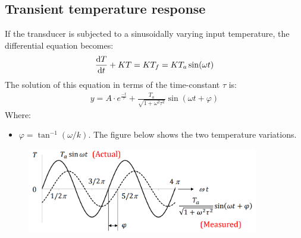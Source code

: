 \documentclass[class=report, crop=false, 12pt,a4paper]{standalone}
\begin{document}
\subsection{Transient temperature response}
If the transducer is subjected to a sinusoidally varying input temperature, the differential equation becomes:
\begin{gather}
  \frac{\dif T}{\dif t}+KT = KT_f = KT_a\sin(\omega t)
\end{gather}
The solution of this equation in terms of the time-constant $\tau$ is:
\begin{gather}
  y = A\cdot e^{\frac{-t}{\tau}}+\frac{T_a}{\sqrt{1+\omega^2\tau^2}}\sin(\omega t+\varphi)
\end{gather}
Where:
\begin{itemize}
  \item $\varphi = \tan^{-1}(\omega/k)$. The figure below shows the two temperature variations.
\end{itemize}
\begin{figure}[H]
  \centering
  \includegraphics[width = 0.9\textwidth]{../img/Mdiagram76.png}
\end{figure}
\end{document}
